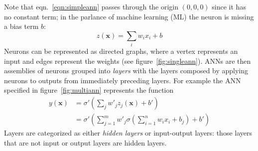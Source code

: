%
Note that eqn.~\eqref{eqn:simpleann} passes through the origin \((0,0,0)\) since it has no constant term; in the parlance of machine learning (ML) the neuron is missing a bias term \(b\):
\begin{equation}
    z(\mathbf{x}) = \sum_i w_i x_i + b
    \label{eqn:linearregr}
\end{equation}
%
Neurons can be represented as directed graphs, where a vertex represents an input and edges represent the weights (see figure~\ref{fig:singleann}).
%
ANNs are then assemblies of neurons grouped into \textit{layers} with the layers composed by applying neurons to outputs from immediately preceding layers.
%
For example the ANN specified in figure~\ref{fig:multiann} represents the function
\begin{equation}
    \begin{split}
        y(\mathbf{x}) &= \sigma' \left( \sum_j w'_j z_j(\mathbf{x}) + b' \right) \\
        &=  \sigma' \left( \sum_{j=1}^m w'_j \sigma\left(\sum_{i=1}^n w_i x_i + b_j\right) + b' \right)
    \end{split}
\end{equation}
%
Layers are categorized as either \textit{hidden layers} or input-output layers: those layers that are not input or output layers are hidden layers.


